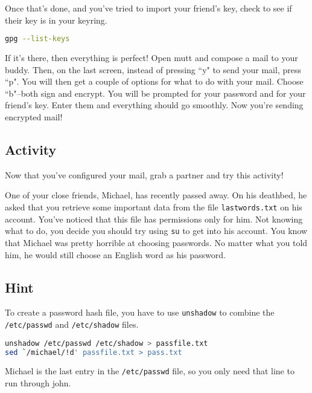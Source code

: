 \documentclass[11pt,a4paper]{article}
\begin{document}
Once that's done, and you've tried to import your friend's key, check to see if their key is in your keyring. 

\begin{lstlisting}[basicstyle=\ttfamily, backgroundcolor = \color{lightgray}, language = bash, xleftmargin = 0cm, framexleftmargin = 1em]
gpg --list-keys
\end{lstlisting}

If it's there, then everything is perfect! Open mutt and compose a mail to your buddy. Then, on the last screen, instead of pressing ``y" to send your mail, press ``p". You will then get a couple of options for what to do with your mail. Choose ``b"--both sign and encrypt. You will be prompted for your password and for your friend's key. Enter them and everything should go smoothly. Now you're sending encrypted mail!

\subsection*{Activity}

\indent\indent Now that you've configured your mail, grab a partner and try this activity!

One of your close friends, Michael, has recently passed away. On his deathbed, he asked that you retrieve some important data from the file \verb|lastwords.txt| on his account. You've noticed that this file has permissions only for him. Not knowing what to do, you decide you should try using \verb|su| to get into his account. You know that Michael was pretty horrible at choosing passwords. No matter what you told him, he would still choose an English word as his password.

\subsection*{Hint}

To create a password hash file, you have to use \verb|unshadow| to combine the \verb|/etc/passwd| and \verb|/etc/shadow| files.

\begin{lstlisting}[basicstyle=\ttfamily, backgroundcolor = \color{lightgray}, language = bash, xleftmargin = 0cm, framexleftmargin = 1em]
unshadow /etc/passwd /etc/shadow > passfile.txt
sed `/michael/!d' passfile.txt > pass.txt
\end{lstlisting}
Michael is the last entry in the \verb|/etc/passwd| file, so you only need that line to run through john. 
\end{document}
